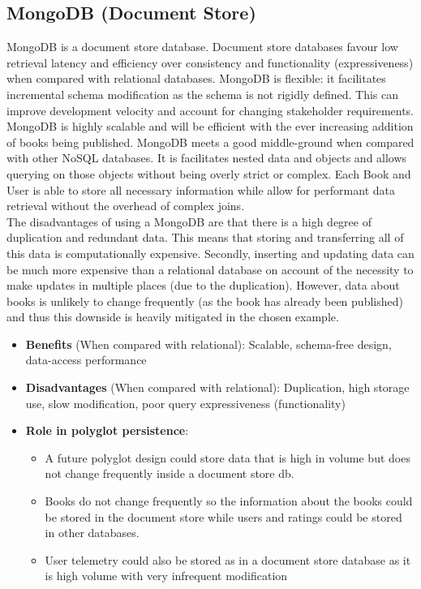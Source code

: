 \documentclass[11pt]{article}
\begin{document}
\subsection{MongoDB (Document Store)}
\label{sec:org93adfaf}
MongoDB is a document store database. Document store databases favour low retrieval latency and efficiency over consistency and functionality (expressiveness) when compared with relational databases. MongoDB is flexible: it facilitates incremental schema modification as the schema is not rigidly defined. This can improve development velocity and account for changing stakeholder requirements.\\
\linebreak
MongoDB is highly scalable and will be efficient with the ever increasing addition of books being published. MongoDB meets a good middle-ground when compared with other NoSQL databases. It is facilitates nested data and objects and allows querying on those objects without being overly strict or complex. Each Book and User is able to store all necessary information while allow for performant data retrieval without the overhead of complex joins.\\
\linebreak
The disadvantages of using a MongoDB are that there is a high degree of duplication and redundant data. This means that storing and transferring all of this data is computationally expensive. Secondly, inserting and updating data can be much more expensive than a relational database on account of the necessity to make updates in multiple places (due to the duplication). However, data about books is unlikely to change frequently (as the book has already been published) and thus this downside is heavily mitigated in the chosen example.

\begin{itemize}
\item \textbf{Benefits} (When compared with relational): Scalable, schema-free design, data-access performance
\item \textbf{Disadvantages} (When compared with relational): Duplication, high storage use, slow modification, poor query expressiveness (functionality)
\item \textbf{Role in polyglot persistence}:
\begin{itemize}
\item A future polyglot design could store data that is high in volume but does not change frequently inside a document store db.
\item Books do not change frequently so the information about the books could be stored in the document store while users and ratings could be stored in other databases.
\item User telemetry could also be stored as in a document store database as it is high volume with very infrequent modification
\end{itemize}
\end{itemize}
\end{document}
